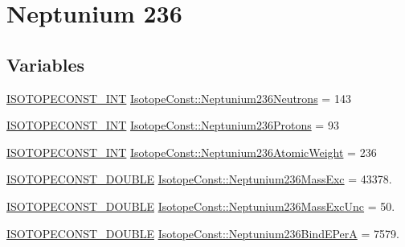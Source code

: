 \hypertarget{group___isotope_const-_neptunium-_np236}{}\section{Neptunium 236}
\label{group___isotope_const-_neptunium-_np236}
\subsection*{Variables}
\begin{DoxyCompactItemize}
\item 
\mbox{\hyperlink{group___isotope_const-_macros_ga5f18360b3e99483a35c32d789e62621c}{I\+S\+O\+T\+O\+P\+E\+C\+O\+N\+S\+T\+\_\+\+I\+NT}} \mbox{\hyperlink{group___isotope_const-_neptunium-_np236_gaa889d7c59eb08953e8ec33320de64dfe}{Isotope\+Const\+::\+Neptunium236\+Neutrons}} = 143
\item 
\mbox{\hyperlink{group___isotope_const-_macros_ga5f18360b3e99483a35c32d789e62621c}{I\+S\+O\+T\+O\+P\+E\+C\+O\+N\+S\+T\+\_\+\+I\+NT}} \mbox{\hyperlink{group___isotope_const-_neptunium-_np236_ga0aea6f4c8e7b7e445d0e12d4df4061a8}{Isotope\+Const\+::\+Neptunium236\+Protons}} = 93
\item 
\mbox{\hyperlink{group___isotope_const-_macros_ga5f18360b3e99483a35c32d789e62621c}{I\+S\+O\+T\+O\+P\+E\+C\+O\+N\+S\+T\+\_\+\+I\+NT}} \mbox{\hyperlink{group___isotope_const-_neptunium-_np236_ga9901d8f659dcc070f29dd7892be52b41}{Isotope\+Const\+::\+Neptunium236\+Atomic\+Weight}} = 236
\item 
\mbox{\hyperlink{group___isotope_const-_macros_ga8f45a7272ce02c0b4c65c44636ed719a}{I\+S\+O\+T\+O\+P\+E\+C\+O\+N\+S\+T\+\_\+\+D\+O\+U\+B\+LE}} \mbox{\hyperlink{group___isotope_const-_neptunium-_np236_ga4b8a0db769d6615ccd1f39f7f347f470}{Isotope\+Const\+::\+Neptunium236\+Mass\+Exc}} = 43378.
\item 
\mbox{\hyperlink{group___isotope_const-_macros_ga8f45a7272ce02c0b4c65c44636ed719a}{I\+S\+O\+T\+O\+P\+E\+C\+O\+N\+S\+T\+\_\+\+D\+O\+U\+B\+LE}} \mbox{\hyperlink{group___isotope_const-_neptunium-_np236_ga434b8ca93311bbfeb8d10bd0c180c0b4}{Isotope\+Const\+::\+Neptunium236\+Mass\+Exc\+Unc}} = 50.
\item 
\mbox{\hyperlink{group___isotope_const-_macros_ga8f45a7272ce02c0b4c65c44636ed719a}{I\+S\+O\+T\+O\+P\+E\+C\+O\+N\+S\+T\+\_\+\+D\+O\+U\+B\+LE}} \mbox{\hyperlink{group___isotope_const-_neptunium-_np236_ga2f0287ea387cf0a78bc3ae357f881f84}{Isotope\+Const\+::\+Neptunium236\+Bind\+E\+PerA}} = 7579.
\item 

\end{DoxyCompactItemize}
